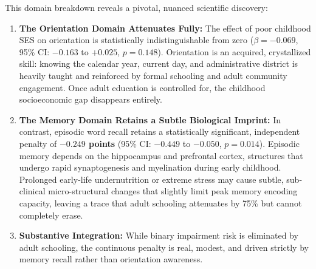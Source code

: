 \begin{table}[!htbp]
\centering
\small
\caption{\textbf{Continuous Cognitive Sensitivity Extension: Adjusted Differences in Domain Scores by Poor Childhood SES (Model B: Adult SES Adjusted, $\mathbf{N=57{,}245}$).}}
\label{tab:extension_cog}
\end{table}

This domain breakdown reveals a pivotal, nuanced scientific discovery:
\begin{enumerate}
    \item \textbf{The Orientation Domain Attenuates Fully:} The effect of poor childhood SES on orientation is statistically indistinguishable from zero ($\beta = -0.069$, 95\% CI: $-0.163$ to $+0.025$, $p = 0.148$). Orientation is an acquired, crystallized skill: knowing the calendar year, current day, and administrative district is heavily taught and reinforced by formal schooling and adult community engagement. Once adult education is controlled for, the childhood socioeconomic gap disappears entirely.
    \item \textbf{The Memory Domain Retains a Subtle Biological Imprint:} In contrast, episodic word recall retains a statistically significant, independent penalty of \textbf{$-0.249$ points} (95\% CI: $-0.449$ to $-0.050$, $p = 0.014$). Episodic memory depends on the hippocampus and prefrontal cortex, structures that undergo rapid synaptogenesis and myelination during early childhood. Prolonged early-life undernutrition or extreme stress may cause subtle, sub-clinical micro-structural changes that slightly limit peak memory encoding capacity, leaving a trace that adult schooling attenuates by 75\% but cannot completely erase.
    \item \textbf{Substantive Integration:} While binary impairment risk is eliminated by adult schooling, the continuous penalty is real, modest, and driven strictly by memory recall rather than orientation awareness.
\end{enumerate}
